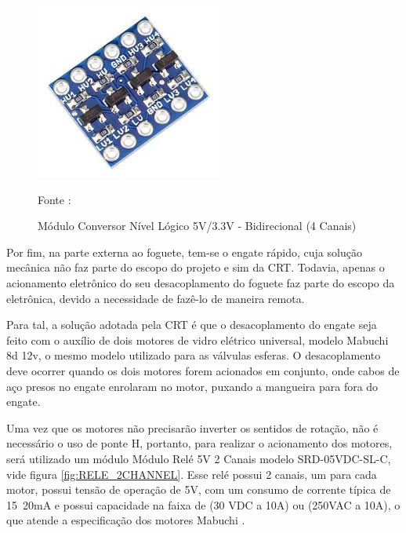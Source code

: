 \begin{figure}[H]
  \centering
  \includegraphics[scale=0.4]{figuras/conv_logico.jpeg}
  \caption{ Módulo Conversor Nível Lógico 5V/3.3V - Bidirecional (4 Canais)} 
  {\footnotesize Fonte : \cite{Conv_logico}} 
  \label{fig:CONV_LOGICO}
\end{figure}

Por fim, na parte externa ao foguete, tem-se o engate rápido, cuja solução mecânica não faz parte do escopo do projeto e sim da CRT. Todavia, apenas o acionamento eletrônico do seu desacoplamento do foguete faz parte do escopo da eletrônica, devido a necessidade de fazê-lo de maneira remota. 

Para tal, a solução adotada pela CRT é que o desacoplamento do engate seja feito com o auxílio de dois motores de vidro elétrico universal, modelo Mabuchi 8d 12v, o mesmo modelo utilizado para as válvulas esferas. O desacoplamento deve ocorrer quando os dois motores forem acionados em conjunto, onde cabos de aço presos no engate enrolaram no motor, puxando a mangueira para fora do engate.

Uma vez que os motores não precisarão inverter os sentidos de rotação, não é necessário o uso de ponte H, portanto, para realizar o acionamento dos motores, será utilizado um módulo  Módulo Relé 5V 2 Canais modelo SRD-05VDC-SL-C, vide figura \ref{fig:RELE_2CHANNEL}. Esse relé possui 2 canais, um para cada motor, possui tensão de operação de 5V, com um consumo de corrente típica de 15~20mA e possui capacidade na faixa de (30 VDC a 10A) ou (250VAC a 10A), o que atende a especificação dos motores Mabuchi \cite{rele_two}.


